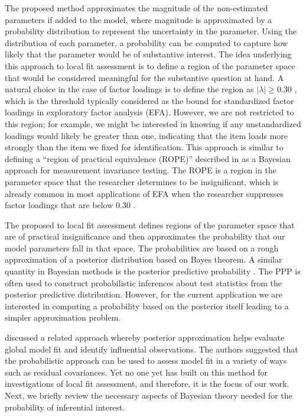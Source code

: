 \documentclass[man, noextraspace, floatsintext, 12pt]{apa7}
\begin{document}
The proposed method approximates the magnitude of the non-estimated parameters if added to the model, where magnitude is approximated by a probability distribution to represent the uncertainty in the parameter. 
Using the distribution of each parameter, a probability can be computed to capture how likely that the parameter would be of substantive interest.
The idea underlying this approach to local fit assessment is to define a region of the parameter space that would be considered meaningful for the substantive question at hand. 
A natural choice in the case of factor loadings is to define the region as $\vert \lambda \vert \geq 0.30$ \citep{Benson1998}, which is the threshold typically considered as the bound for standardized factor loadings in exploratory factor analysis (EFA).
However, we are not restricted to this region; for example, we might be interested in knowing if any unstandardized loadings would likely be greater than one, indicating that the item loads more strongly than the item we fixed for identification.
This approach is similar to defining a ``region of practical equivalence (ROPE)'' described in \textcite{Shi2019} as a Bayesian approach for measurement invariance testing.
The ROPE is a region in the parameter space that the researcher determines to be insignificant, which is already common in most applications of EFA when the researcher suppresses factor loadings that are below 0.30 \citep{Benson1998}.

The proposed to local fit assessment defines regions of the parameter space that are of practical insignificance and then approximates the probability that our model parameters fall in that space.
The probabilities are based on a rough approximation of a posterior distribution based on Bayes theorem.
A similar quantity in Bayesian methods is the posterior predictive probability \citep[PPP or $p$-value, ][]{Gelman1996, Rubin1996}.
The PPP is often used to construct probabilistic inferences about test statistics from the posterior predictive distribution.
However, for the current application we are interested in computing a probability based on the posterior itself leading to a simpler approximation problem.
 
\textcite{Lee2016} discussed a related approach whereby posterior approximation helps evaluate global model fit and identify influential observations.
The authors suggested that the probabilistic approach can be used to assess model fit in a variety of ways such as residual covariances.
Yet no one yet has built on this method for investigations of local fit assessment, and therefore, it is the focus of our work.
Next, we briefly review the necessary aspects of Bayesian theory needed for the probability of inferential interest.
\end{document}
